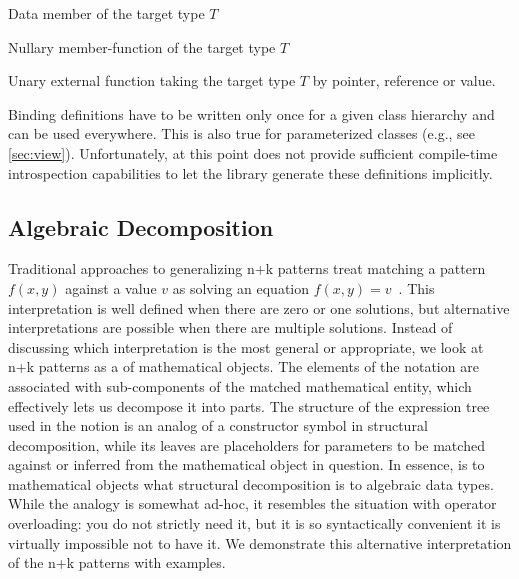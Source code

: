 \begin{compactitem}
\setlength{\itemsep}{0pt}
\setlength{\parskip}{0pt}
\item Data member of the target type $T$
\item Nullary member-function of the target type $T$
\item Unary external function taking the target type $T$ by pointer, reference or value.
\end{compactitem}

\noindent
Binding definitions have to be written only once for a given class hierarchy and 
can be used everywhere. This is also true for parameterized classes (e.g., see \textsection\ref{sec:view}).
Unfortunately, at this point 
\Cpp{} does not provide sufficient compile-time introspection capabilities to let the 
library generate these definitions implicitly.

\subsection{Algebraic Decomposition}
\label{sec:slv}

Traditional approaches to generalizing n+k patterns treat matching a pattern 
$f(x,y)$ against a value $v$ as solving an equation $f(x,y)=v$~\cite{OosterhofThesis}. 
This interpretation is well defined when there are zero or one solutions,
but alternative interpretations are possible when there are multiple solutions. 
Instead of discussing which interpretation is the most general or appropriate, 
we look at n+k patterns as a  of 
mathematical objects. The elements of the notation are associated with 
sub-components of the matched mathematical entity, which effectively lets us 
decompose it into parts. The structure of the expression tree used in the notion
is an analog of a constructor symbol in structural decomposition, while its 
leaves are placeholders for parameters to be matched against or inferred from 
the mathematical object in question. In essence,  
is to mathematical objects what structural decomposition is to algebraic data 
types. While the analogy is somewhat ad-hoc, it resembles the situation with 
operator overloading: you do not strictly need it, but it is so syntactically 
convenient it is virtually impossible not to have it. We demonstrate this 
alternative interpretation of the n+k patterns with examples.

